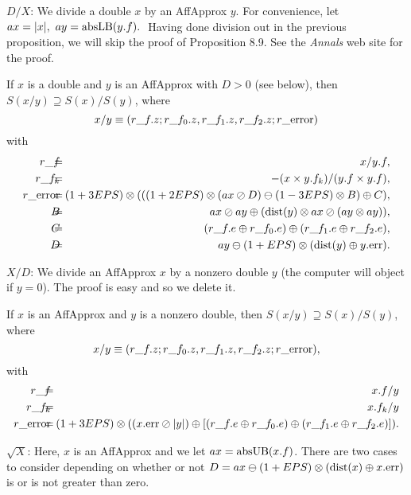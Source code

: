 $D/X$:
We   divide a double $x$ by an AffApprox $y$.
For convenience, let $ax = |x|,\ ay = {\rm absLB}(y.f).\ $  Having done division out in the previous proposition, we will skip the proof of Proposition 8.9.  See the {\it Annals}
web site for the proof.

 If $x$ is a double and $y$ is an 
{\rm AffApprox}  with $D > 0$ {\rm (}\/see below{\rm ),}
 then $S(x / y) \supseteq S(x) / S(y)${\rm ,} where
$$x / y \equiv (r\_f.z; r\_f_0.z, r\_f_1.z, r\_f_2.z; r\_{\rm error})$$
with
 \begin{eqnarray*}
r\_f&\hskip-8pt =\hskip-8pt& x / y.f,\\
r\_f_k&\hskip-8pt =\hskip-8pt& -(x \times y.f_k)/ (y.f \times y.f),\\
r\_{\rm error}&\hskip-8pt =\hskip-8pt& (1+3EPS) \otimes ( 
((1 + 2EPS) \otimes (ax  \oslash D) \ominus (1 - 3EPS) \otimes B)
\oplus C),\\
 B&\hskip-8pt =\hskip-8pt& ax \oslash ay  \oplus ({\rm dist}(y) \otimes ax \oslash (ay \otimes ay)),\\
C& \hskip-8pt=\hskip-8pt& (r\_f.e \oplus r\_f_0.e)
\oplus (r\_f_1.e \oplus r\_f_2.e),\\
D &\hskip-8pt=\hskip-8pt& ay \ominus (1 + EPS) \otimes ({\rm dist}(y) \oplus y.{\rm err}).
\end{eqnarray*}
\endproclaim

$X/D$:
We   divide an AffApprox $x$ by a nonzero double $y$ (the computer will object if $y = 0$).  The proof is easy  and
so we delete it.

If $x$ is an {\rm AffApprox}  and $y$ is a nonzero double{\rm ,} then
$S(x / y) \supseteq S(x) / S(y)${\rm ,} where
$$x / y \equiv (r\_f.z; r\_f_0.z, r\_f_1.z, r\_f_2.z; r\_{\rm error}),$$
with
\begin{eqnarray*}
r\_f &\hskip-8pt=\hskip-8pt& x.f / y\\
r\_f_k &\hskip-8pt=\hskip-8pt& x.f_k / y\\
r\_{\rm error} &\hskip-8pt = \hskip-8pt&
(1+3EPS) \otimes ( 
(x.{\rm err}\oslash |y|)
\oplus 
[(r\_f.e \oplus r\_f_0.e) \oplus (r\_f_1.e \oplus r\_f_2.e)]
                                               ).\end{eqnarray*}
\endproclaim

$\sqrt X$: 
Here, $x$ is an AffApprox and we let $ax = {\rm absUB}(x.f)$.  There are two cases to consider depending on whether or not
$D = ax \ominus (1 + EPS) \otimes ({\rm dist}(x) \oplus x.{\rm err})$ is or is not greater than zero.

